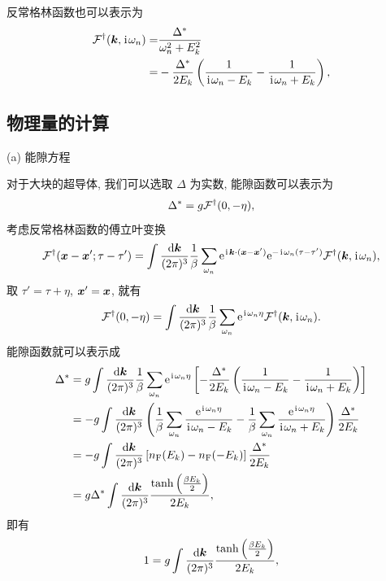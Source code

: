 反常格林函数也可以表示为 
  \begin{align}
        \mathcal{F}^\dagger(\boldsymbol{k},\hspace{0.1em}\mathrm{i}\hspace{0.1em}\omega_n)=&\frac{\Delta^*}{\omega_n^2+E_k^2}\nonumber\\
        =&-\frac{\Delta^*}{2E_k}\left( \frac{1}{\hspace{0.1em}\mathrm{i}\hspace{0.1em}\omega_n-E_k}-\frac{1}{\hspace{0.1em}\mathrm{i}\hspace{0.1em}\omega_n+E_k} \right),
    \end{align}
\subsection{物理量的计算}
(a) 能隙方程 

对于大块的超导体, 我们可以选取 $\Delta$ 为实数, 能隙函数可以表示为 
\begin{equation}
    \Delta^*=g\mathcal{F}^\dagger(0,-\eta),
\end{equation}
考虑反常格林函数的傅立叶变换 
\begin{equation}
    \mathcal{F}^\dagger(\boldsymbol{x}-\boldsymbol{x}';\tau-\tau')=\int\frac{\mathrm{d}\boldsymbol{k}}{(2\pi)^3}\frac{1}{\beta}\sum_{\omega_n}\mathrm{e}^{\hspace{0.1em}\mathrm{i}\hspace{0.1em}\boldsymbol{k}\cdot(\boldsymbol{x}-\boldsymbol{x}')}\mathrm{e}^{-\hspace{0.1em}\mathrm{i}\hspace{0.1em}\omega_n(\tau-\tau')}\mathcal{F}^\dagger(\boldsymbol{k},\hspace{0.1em}\mathrm{i}\hspace{0.1em}\omega_n),
\end{equation}
取 $\tau'=\tau+\eta$, $\boldsymbol{x}'=\boldsymbol{x}$, 就有 
\begin{equation}
    \mathcal{F}^\dagger(0,-\eta)=\int\frac{\mathrm{d}\boldsymbol{k}}{(2\pi)^3}\frac{1}{\beta}\sum_{\omega_n}\mathrm{e}^{\hspace{0.1em}\mathrm{i}\hspace{0.1em}\omega_n\eta}\mathcal{F}^\dagger(\boldsymbol{k},\hspace{0.1em}\mathrm{i}\hspace{0.1em}\omega_n).
\end{equation}
能隙函数就可以表示成 
  \begin{align}
        \Delta^*&=g\int\frac{\mathrm{d}\boldsymbol{k}}{(2\pi)^3}\frac{1}{\beta}\sum_{\omega_n}\mathrm{e}^{\hspace{0.1em}\mathrm{i}\hspace{0.1em}\omega_n\eta}\left[ -\frac{\Delta^*}{2E_k}\left( \frac{1}{\hspace{0.1em}\mathrm{i}\hspace{0.1em}\omega_n-E_k}-\frac{1}{\hspace{0.1em}\mathrm{i}\hspace{0.1em}\omega_n+E_k} \right) \right]\nonumber\\
        &=-g\int\frac{\mathrm{d}\boldsymbol{k}}{(2\pi)^3}\left( \frac{1}{\beta}\sum_{\omega_n}\frac{\mathrm{e}^{\hspace{0.1em}\mathrm{i}\hspace{0.1em}\omega_n\eta}}{\hspace{0.1em}\mathrm{i}\hspace{0.1em}\omega_n-E_k}-\frac{1}{\beta}\sum_{\omega_n}\frac{\mathrm{e}^{\hspace{0.1em}\mathrm{i}\hspace{0.1em}\omega_n\eta}}{\hspace{0.1em}\mathrm{i}\hspace{0.1em}\omega_n+E_k} \right)\frac{\Delta^*}{2E_k}\nonumber\\
        &=-g\int\frac{\mathrm{d}\boldsymbol{k}}{(2\pi)^3}\left[ n_{\mathrm{F}}(E_k)-n_{\mathrm{F}}(-E_k) \right]\frac{\Delta^*}{2E_k}\nonumber\\
        &=g\Delta^*\int\frac{\mathrm{d}\boldsymbol{k}}{(2\pi)^3}\frac{\tanh\left( \frac{\beta E_k}{2} \right)}{2E_k},
    \end{align}
即有 
\begin{equation}
    1=g\int\frac{\mathrm{d}\boldsymbol{k}}{(2\pi)^3}\frac{\tanh\left( \frac{\beta E_k}{2} \right)}{2E_k},
\end{equation}
